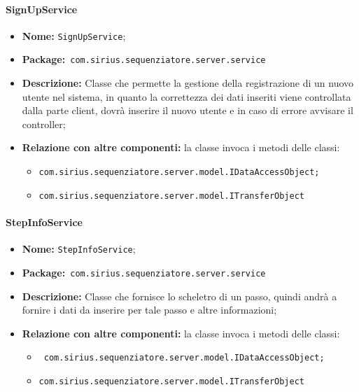 \paragraph{SignUpService}
	\begin{itemize}
		\item \textbf{Nome:} \texttt{SignUpService};
		\item \textbf{Package:}\texttt{ com.sirius.sequenziatore.server.service}
		\item \textbf{Descrizione:} Classe che permette la gestione della registrazione di un nuovo utente nel sistema, in quanto la correttezza dei dati inseriti viene controllata dalla parte client, dovrà inserire il nuovo utente e in caso di errore avvisare il controller;
		\item \textbf{Relazione con altre componenti:} la classe invoca i metodi delle classi:
		\begin{itemize}
			\item \texttt{com.sirius.sequenziatore.server.model.IDataAccessObject;}
			\item \texttt{com.sirius.sequenziatore.server.model.ITransferObject}
		\end{itemize}
	\end{itemize}
\paragraph{StepInfoService}
	\begin{itemize}
		\item \textbf{Nome:} \texttt{StepInfoService};
		\item \textbf{Package:}\texttt{ com.sirius.sequenziatore.server.service}
		\item \textbf{Descrizione:} Classe che fornisce lo scheletro di un passo, quindi andrà a fornire i dati da inserire per tale passo e altre informazioni;
		\item \textbf{Relazione con altre componenti:} la classe invoca i metodi delle classi:
		\begin{itemize}
			\item \texttt{ com.sirius.sequenziatore.server.model.IDataAccessObject;}
			\item \texttt{com.sirius.sequenziatore.server.model.ITransferObject}
		\end{itemize}
	\end{itemize}

